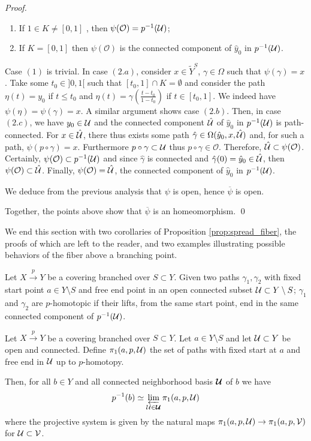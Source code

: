 \begin{proof}
\begin{itemize}
\begin{enumerate}
\begin{enumerate}
     
     \item If $1\in K\neq [0,1]$ , then $\psi(\mathcal O)= p^{-1}(\mathcal{U})$;
     \item If $K = [0,1]$ then $\psi(\mathcal O)$ is the connected component of $\hat y_0$ in $p^{-1}(\mathcal{U})$.
    \end{enumerate}
\end{enumerate}
Case $(1)$ is trivial. In case $(2.a)$, consider $x\in \widetilde Y^S$, $\gamma\in \Omega$ such that $\psi(\gamma)=x$. Take some $t_0\in ]0,1[$ such that $[t_0,1]\cap K = \emptyset$ and consider the path $\eta(t)=y_0$ if $t\leq t_0$ and 
$\eta(t)=\gamma(\frac{t-t_0}{1-t_0})$ if $t\in [t_0,1]$. We indeed have $\psi(\eta)=\psi(\gamma)=x$. A similar argument shows case $(2.b)$. 
Then, in case $(2.c)$, we have $y_0\in \mathcal{U}$ and the connected component $\hat{\mathcal{U}}$ of $\hat y_0$ in $p^{-1}(\mathcal{U})$  is path-connected. For $x\in \hat{\mathcal{U}}$, there thus exists some path $\hat\gamma \in \Omega(\hat y_0,x,\hat {\mathcal{U}})$ and, for such a path, $\psi(p\circ \gamma)=x$. Furthermore $p\circ \gamma\subset \mathcal{U}$ thus $p\circ \gamma\in \mathcal O$. Therefore, $\hat {\mathcal{U}} \subset \psi(\mathcal O)$. Certainly, $\psi(\mathcal O)\subset p^{-1}(\mathcal{U})$ and since $\hat\gamma$ is connected and $\hat\gamma(0)=\hat y_0\in \hat{\mathcal{U}}$, then $\psi(\mathcal O)\subset \hat {\mathcal{U}}$.
Finally, $\psi(\mathcal O)=\hat {\mathcal{U}}$, the connected component of $\hat y_0$ in $p^{-1}(\mathcal{U})$.

We deduce from the previous analysis that $\psi$ is open, hence $\overline \psi$ is open.
\end{itemize}
Together, the points above show that $\overline \psi$ is an homeomorphism.
\qed\end{proof}

We end this section with two corollaries of Proposition \ref{prop:spread_fiber}, the proofs of which are left to the reader, and two examples illustrating possible behaviors of the fiber above a branching point. 
\begin{defi}\label{def:covering_branched_two_paths} 
 Let $X\xrightarrow{p} Y$ be a  covering branched over $S\subset Y$. 
 Given two paths $\gamma_1,\gamma_2$ with fixed start point $a\in Y\setminus S$ and free end point in an open connected subset $\mathcal{U}\subset Y\setminus S$; $\gamma_1$ and $\gamma_2$ are $p$-homotopic if their lifts, from the same start point, end in the same connected component of $p^{-1}(\mathcal{U})$.
\end{defi}

  \begin{prop} \label{prop:general_fiber_path}
  Let $X\xrightarrow{p} Y$ be a  covering branched over $S\subset Y$. Let $a\in Y\setminus S$ and let $\mathcal{U}\subset Y$ be open and connected.  Define
$\pi_1(a,p,\mathcal{U})$ the set of paths with fixed start at $a$ and free end in $\mathcal{U}$ up to $p$-homotopy.

Then, for all $b\in Y$ and all connected neighborhood basis $\boldsymbol {\mathcal{U}}$ of $b$ we have 
  $$ p^{-1}(b) \simeq \varprojlim_{\mathcal{U}\in \boldsymbol{\mathcal{U}}} \pi_1(a,p,\mathcal{U})$$
  where the projective system is given by the natural maps $\pi_1(a,p,\mathcal{U})\rightarrow \pi_1(a,p,\mathcal V)$  for $\mathcal{U}\subset \mathcal V$.
\end{prop}


